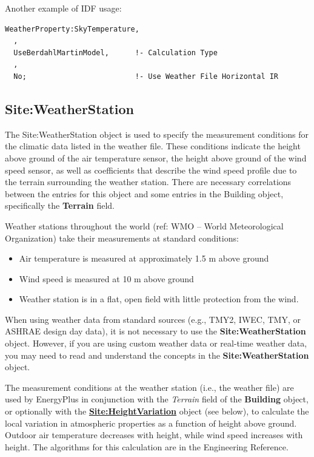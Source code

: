Another example of IDF usage:

\begin{lstlisting}
WeatherProperty:SkyTemperature,
  ,
  UseBerdahlMartinModel,      !- Calculation Type
  ,
  No;                         !- Use Weather File Horizontal IR
\end{lstlisting}


\subsection{Site:WeatherStation}\label{siteweatherstation}

The Site:WeatherStation object is used to specify the measurement conditions for the climatic data listed in the weather file. These conditions indicate the height above ground of the air temperature sensor, the height above ground of the wind speed sensor, as well as coefficients that describe the wind speed profile due to the terrain surrounding the weather station. There are necessary correlations between the entries for this object and some entries in the Building object, specifically the \textbf{Terrain} field.

Weather stations throughout the world (ref: WMO -- World Meteorological Organization) take their measurements at standard conditions:

\begin{itemize}
\item
  Air temperature is measured at approximately 1.5 m above ground
\item
  Wind speed is measured at 10 m above ground
\item
  Weather station is in a flat, open field with little protection from the wind.
\end{itemize}

When using weather data from standard sources (e.g., TMY2, IWEC, TMY, or ASHRAE design day data), it is not necessary to use the \textbf{Site:WeatherStation} object. However, if you are using custom weather data or real-time weather data, you may need to read and understand the concepts in the \textbf{Site:WeatherStation} object.

The measurement conditions at the weather station (i.e., the weather file) are used by EnergyPlus in conjunction with the \emph{Terrain} field of the \textbf{Building} object, or optionally with the \textbf{\hyperref[siteheightvariation]{Site:HeightVariation}} object (see below), to calculate the local variation in atmospheric properties as a function of height above ground. Outdoor air temperature decreases with height, while wind speed increases with height. The algorithms for this calculation are in the Engineering Reference.


